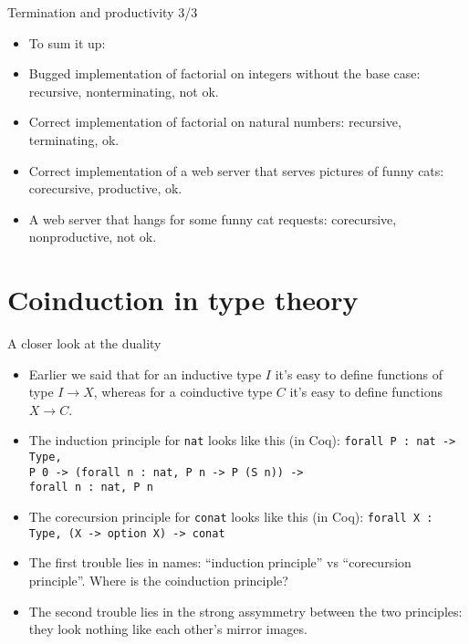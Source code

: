 \documentclass{beamer}
\begin{document}
\begin{frame}{Termination and productivity 3/3}
\begin{itemize}
	\item To sum it up:
	\item Bugged implementation of factorial on integers without the base case: recursive, nonterminating, not ok.
	\item Correct implementation of factorial on natural numbers: recursive, terminating, ok.
	\item Correct implementation of a web server that serves pictures of funny cats: corecursive, productive, ok.
	\item A web server that hangs for some funny cat requests: corecursive, nonproductive, not ok.
\end{itemize}
\end{frame}

\section{Coinduction in type theory}

\begin{frame}{A closer look at the duality}
\begin{itemize}
	\item Earlier we said that for an inductive type $I$ it's easy to define functions of type $I \to X$, whereas for a coinductive type $C$ it's easy to define functions $X \to C$.
	\item The induction principle for \texttt{nat} looks like this (in Coq): \texttt{forall P : nat -> Type, \\ P 0 -> (forall n : nat, P n -> P (S n)) -> \\ forall n : nat, P n}
	\item The corecursion principle for \texttt{conat} looks like this (in Coq): \texttt{forall X : Type, (X -> option X) -> conat}
	\item The first trouble lies in names: ``induction principle'' vs ``corecursion principle''. Where is the coinduction principle?
	\item The second trouble lies in the strong assymmetry between the two principles: they look nothing like each other's mirror images.
\end{itemize}
\end{frame}
\end{document}
